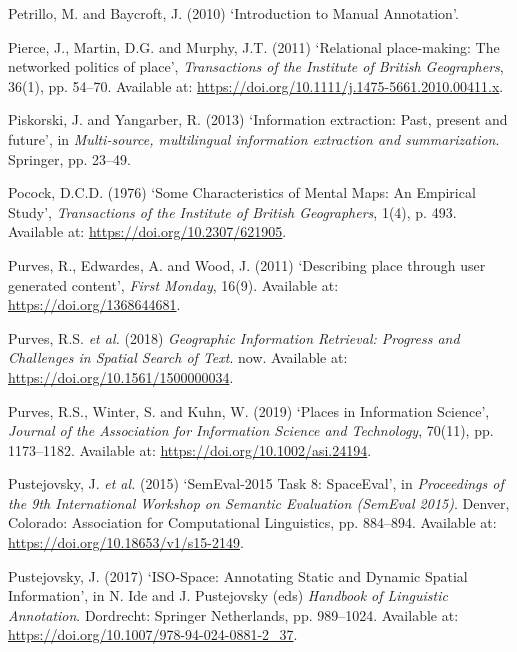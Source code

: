 \documentclass[
  letterpaper,
  11pt,
  english,
  onehalfspacing,
  headsepline]{MastersDoctoralThesis}
\newlength{\cslhangindent}
\newlength{\cslentryspacingunit} %
\newenvironment{CSLReferences}[2] %
 {%
  \setlength{\parindent}{0pt}
  \ifodd #1
  \let\oldpar\par
  \def\par{\hangindent=\cslhangindent\oldpar}
  \fi
  \setlength{\parskip}{#2\cslentryspacingunit}
 }%
 {}
\begin{document}
\begin{CSLReferences}{0}{0}
\leavevmode{}%
Petrillo, M. and Baycroft, J. (2010) {`Introduction to {Manual
Annotation}'}.

\leavevmode{}%
Pierce, J., Martin, D.G. and Murphy, J.T. (2011) {`Relational
place-making: The networked politics of place'}, \emph{Transactions of
the Institute of British Geographers}, 36(1), pp. 54--70. Available at:
\url{https://doi.org/10.1111/j.1475-5661.2010.00411.x}.

\leavevmode{}%
Piskorski, J. and Yangarber, R. (2013) {`Information extraction: {Past},
present and future'}, in \emph{Multi-source, multilingual information
extraction and summarization}. {Springer}, pp. 23--49.

\leavevmode{}%
Pocock, D.C.D. (1976) {`Some {Characteristics} of {Mental Maps}: {An
Empirical Study}'}, \emph{Transactions of the Institute of British
Geographers}, 1(4), p. 493. Available at:
\url{https://doi.org/10.2307/621905}.

\leavevmode{}%
Purves, R., Edwardes, A. and Wood, J. (2011) {`Describing place through
user generated content'}, \emph{First Monday}, 16(9). Available at:
\url{https://doi.org/1368644681}.

\leavevmode{}%
Purves, R.S. \emph{et al.} (2018) \emph{Geographic {Information
Retrieval}: {Progress} and {Challenges} in {Spatial Search} of {Text}}.
{now}. Available at: \url{https://doi.org/10.1561/1500000034}.

\leavevmode{}%
Purves, R.S., Winter, S. and Kuhn, W. (2019) {`Places in {Information
Science}'}, \emph{Journal of the Association for Information Science and
Technology}, 70(11), pp. 1173--1182. Available at:
\url{https://doi.org/10.1002/asi.24194}.

\leavevmode{}%
Pustejovsky, J. \emph{et al.} (2015) {`{SemEval-2015 Task} 8:
{SpaceEval}'}, in \emph{Proceedings of the 9th {International Workshop}
on {Semantic Evaluation} ({SemEval} 2015)}. {Denver, Colorado}:
{Association for Computational Linguistics}, pp. 884--894. Available at:
\url{https://doi.org/10.18653/v1/s15-2149}.

\leavevmode{}%
Pustejovsky, J. (2017) {`{ISO-Space}: {Annotating Static} and {Dynamic
Spatial Information}'}, in N. Ide and J. Pustejovsky (eds)
\emph{Handbook of {Linguistic Annotation}}. {Dordrecht}: {Springer
Netherlands}, pp. 989--1024. Available at:
\url{https://doi.org/10.1007/978-94-024-0881-2_37}.


\end{CSLReferences}
\end{document}
